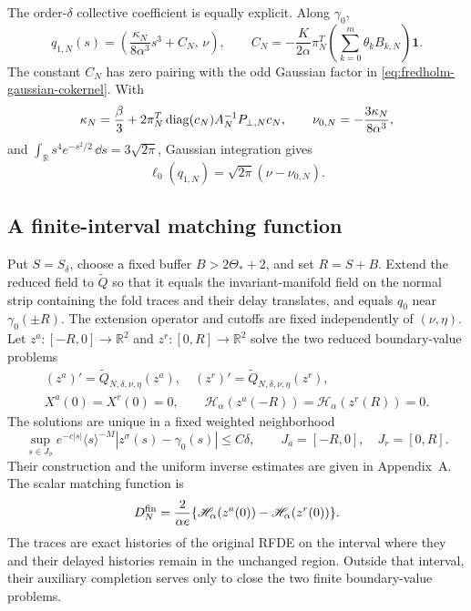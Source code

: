 The order-\(\delta\) collective coefficient is equally explicit.  Along
\(\gamma_0\),
\begin{equation*}
 q_{1,N}(s)
 =\left(\frac{\kappa_N}{8\alpha^3}s^3+C_N,\,\nu\right),
 \qquad
 C_N=-\frac{K}{2\alpha}\pi_N^T
           \left(\sum_{k=0}^m\theta_kB_{k,N}\right)\mathbf1.
\end{equation*}
The constant \(C_N\) has zero pairing with the odd Gaussian factor in
\cref{eq:fredholm-gaussian-cokernel}.  With
\[
 \kappa_N=\frac\beta3
   +2\pi_N^T\operatorname{diag}(c_N)A_N^{-1}P_{\perp,N}c_N,
 \qquad
 \nu_{0,N}=-\frac{3\kappa_N}{8\alpha^3},
\]
and
\(\int_{\mathbb R}s^4e^{-s^2/2}\,\dd s=3\sqrt{2\pi}\), Gaussian
integration gives
\begin{equation}
 \ell_0(q_{1,N})=\sqrt{2\pi}(\nu-\nu_{0,N}).        \label{eq:fold-parameter-pairing}
\end{equation}

\subsection{A finite-interval matching function}

Put \(S=S_\delta\), choose a fixed buffer \(B>2\Theta_*+2\), and set
\(R=S+B\).  Extend the reduced field to \(\widetilde Q\) so that it equals
the invariant-manifold field on the normal strip containing the fold traces
and their delay translates, and equals \(q_0\) near \(\gamma_0(\pm R)\).
The extension operator and cutoffs are fixed independently of \((\nu,\eta)\).
Let \(z^a:[-R,0]\to\mathbb R^2\) and
\(z^r:[0,R]\to\mathbb R^2\) solve the two reduced boundary-value problems
\begin{equation}
 \begin{gathered}
 (z^a)'=\widetilde Q_{N,\delta,\nu,\eta}(z^a),
 \quad (z^r)'=\widetilde Q_{N,\delta,\nu,\eta}(z^r),\\
 X^a(0)=X^r(0)=0,
 \qquad
 \mathscr H_\alpha(z^a(-R))
  =\mathscr H_\alpha(z^r(R))=0.
 \end{gathered}                                    \label{eq:finite-trace-BVP}
\end{equation}
The solutions are unique in a fixed weighted neighborhood
\[
 \sup_{s\in J_\sigma}e^{-c|s|}\langle s\rangle^{-M}
       |z^\sigma(s)-\gamma_0(s)|\le C\delta,
 \qquad J_a=[-R,0],\quad J_r=[0,R].
\]
Their construction and the uniform inverse estimates are given in
Appendix~A.  The scalar matching function is
\begin{equation}
 D_N^{\rm fin}
 =\frac{2}{\alpha e}
   \{\mathscr H_\alpha(z^a(0))-\mathscr H_\alpha(z^r(0))\}.
 \label{eq:finite-matching-definition}
\end{equation}
The traces are exact histories of the original RFDE on the interval where
they and their delayed histories remain in the unchanged region.  Outside that
interval, their auxiliary completion serves only to close the two finite
boundary-value problems.

